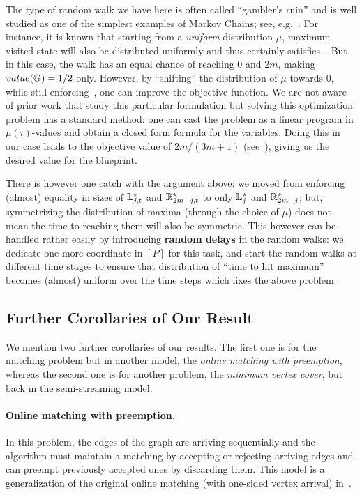 The type of random walk we have here is often called ``gambler's ruin'' and is well studied as one of the simplest examples of Markov Chains; see, e.g.~\cite[Section 2.1]{levin2026markov}. 
For instance, it is known that starting from a \emph{uniform} distribution $\mu$, maximum visited state will also be distributed uniformly and thus certainly satisfies~. But in this case, 
the walk has an equal chance of reaching $0$ and $2m$, making $value(\mathbb{G})=1/2$ only. However, by ``shifting'' the distribution of $\mu$ towards $0$, while still enforcing~, one
can improve the objective function. We are not aware of prior work that study this particular formulation but solving this optimization problem has a standard method: one can cast the problem as a 
linear program in $\mu(i)$-values and obtain a closed form formula for the variables. Doing this in our case leads to the objective value of $2m/(3m+1)$ (see~), giving us 
the desired value for the blueprint. 

There is however one catch with the argument above: we moved from enforcing (almost) equality in sizes of $\mathbb{L}^{\star}_{j,t}$ and $\mathbb{R}^{\star}_{2m-j,t}$ to only $\mathbb{L}^{\star}_j$ and $\mathbb{R}^{\star}_{2m-j}$; but, symmetrizing the distribution 
of maxima (through the choice of $\mu$) does not mean the time to reaching them will also be symmetric. This however can be handled rather easily by introducing \textbf{random delays} in the random walks: we dedicate one more coordinate in $[P]$
for this task, and start the random walks at different time stages to ensure that distribution of ``time to hit maximum'' becomes (almost) uniform over the time steps which fixes the above problem. 

\subsection{Further Corollaries of Our Result}\label{sec:corollary} 

We mention two further corollaries of our results. The first one is for the matching problem but in another model, the \emph{online matching with preemption}, whereas the second one is for another problem, the \emph{minimum vertex cover}, but back
in the semi-streaming model. 

\paragraph{Online matching with preemption.} In this problem, the edges of the graph are arriving sequentially
and the algorithm must maintain a matching by accepting or rejecting arriving edges and can preempt previously accepted ones by discarding them. This model is a generalization of the original online matching (with one-sided vertex arrival) in~\cite{KarpVV90}. 

